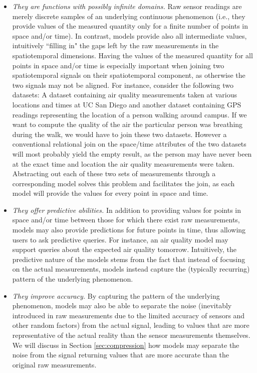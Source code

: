 \begin{itemize}
\item \emph{They are functions with possibly infinite domains.} Raw sensor readings are merely discrete samples of an underlying continuous phenomenon (i.e., they provide values of the measured quantity only for a finite number of points in space and/or time). In contrast, models provide also all intermediate values, intuitively ``filling in" the gaps left by the raw measurements in the spatiotemporal dimensions. Having the values of the measured quantity for all points in space and/or time is especially important when joining two spatiotemporal signals on their spatiotemporal component, as otherwise the two signals may not be aligned. For instance, consider the following two datasets: A dataset containing air quality measurements taken at various locations and times at UC San Diego and another dataset containing GPS readings representing the location of a person walking around campus. If we want to compute the quality of the air the particular person was breathing during the walk, we would have to join these two datasets. However a conventional relational join on the space/time attributes of the two datasets will most probably yield the empty result, as the person may have never been at the exact time and location the air quality measurements were taken. Abstracting out each of these two sets of measurements through a corresponding model solves this problem and facilitates the join, as each model will provide the values for every point in space and time.
\item \emph{They offer predictive abilities.} In addition to providing values for points in space and/or time between those for which there exist raw measurements, models may also provide predictions for future points in time, thus allowing users to ask predictive queries. For instance, an air quality model may support queries about the expected air quality tomorrow. Intuitively, the predictive nature of the models stems from the fact that instead of focusing on the actual measurements, models instead capture the (typically recurring) pattern of the underlying phenomenon.
\item \emph{They improve accuracy.} By capturing the pattern of the underlying phenomenon, models may also be able to separate the noise (inevitably introduced in raw measurements due to the limited accuracy of sensors and other random factors) from the actual signal, leading to values that are more representative of the actual reality than the sensor measurements themselves. We will discuss in Section \ref{sec:compression} how models may separate the noise from the signal returning values that are more accurate than the original raw measurements.

\end{itemize}
